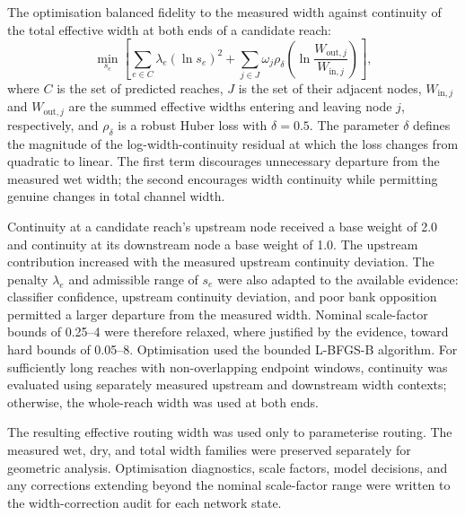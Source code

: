 The optimisation balanced fidelity to the measured width against continuity of the total effective width at both ends of a candidate reach:
\begin{equation}
\min_{s_e} \left[ \sum_{e\in C}\lambda_e\left(\ln s_e\right)^2 + \sum_{j\in J}\omega_j\rho_{\delta}\left(\ln\frac{W_{\mathrm{out},j}}{W_{\mathrm{in},j}}\right) \right],
\end{equation}
where $C$ is the set of predicted reaches, $J$ is the set of their adjacent nodes, $W_{\mathrm{in},j}$ and $W_{\mathrm{out},j}$ are the summed effective widths entering and leaving node $j$, respectively, and $\rho_{\delta}$ is a robust Huber loss with $\delta=0.5$. The parameter $\delta$ defines the magnitude of the log-width-continuity residual at which the loss changes from quadratic to linear. The first term discourages unnecessary departure from the measured wet width; the second encourages width continuity while permitting genuine changes in total channel width.

Continuity at a candidate reach's upstream node received a base weight of 2.0 and continuity at its downstream node a base weight of 1.0. The upstream contribution increased with the measured upstream continuity deviation. The penalty $\lambda_e$ and admissible range of $s_e$ were also adapted to the available evidence: classifier confidence, upstream continuity deviation, and poor bank opposition permitted a larger departure from the measured width. Nominal scale-factor bounds of 0.25--4 were therefore relaxed, where justified by the evidence, toward hard bounds of 0.05--8. Optimisation used the bounded L-BFGS-B algorithm. For sufficiently long reaches with non-overlapping endpoint windows, continuity was evaluated using separately measured upstream and downstream width contexts; otherwise, the whole-reach width was used at both ends.

The resulting effective routing width was used only to parameterise routing. The measured wet, dry, and total width families were preserved separately for geometric analysis. Optimisation diagnostics, scale factors, model decisions, and any corrections extending beyond the nominal scale-factor range were written to the width-correction audit for each network state.
